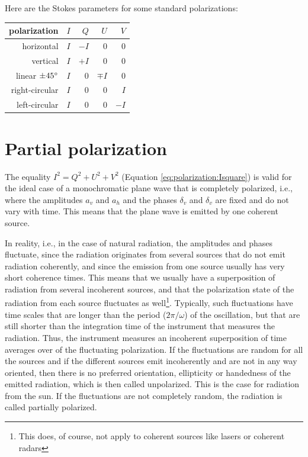 Here are the Stokes parameters for some standard polarizations:
\begin{center}
\label{stokes-examples}
\begin{tabular}{r@{\hspace{2em}(}r@{,}r@{,}r@{,}r@{)}}
\hline
polarization & $I$ &   $Q$   &   $U$  &   $V$ \\ \hline
horizontal   & $I$ &  $-I$   &    0   &   0   \\ 
vertical     & $I$ &  $+I$   &    0   &   0   \\ 
linear $\pm 45^\circ$
             & $I$ &   0     &$\mp I$ &   0   \\ 
right-circular& $I$ &  0     &    0   &   $I$ \\ 
left-circular& $I$ &   0     &    0   &  $-I$ \\ \hline
\end{tabular}
\end{center}



\section{Partial polarization}
\label{sec:polarization:part_pol}
The equality   $I^2 = Q^2 + U^2 + V^2$
(Equation \ref{eq:polarization:Isquare}) 
is valid for the ideal case of a 
monochromatic plane wave that is completely polarized, i.e., where the
amplitudes $a_v$ and
$a_h$ and the phases $\delta_v$ and $\delta_v$ are fixed and do not
vary with time. This means that the plane wave is emitted by one
coherent source.

In reality, i.e., in the case of natural radiation, 
the amplitudes and phases fluctuate, since the radiation
originates from several sources that do not emit radiation coherently,
and since the emission from one source usually has very short
coherence times. This
means that we usually have a superposition of radiation from several incoherent
sources, and that the polarization state of the radiation from each
source fluctuates as well\footnote{This does, of course, not apply to
  coherent sources like lasers or coherent radars}. 
Typically, such fluctuations have time scales that are longer than the
period ($2\pi/\omega$) of the oscillation, but that are still shorter
than the integration time of the instrument that measures the
radiation. Thus, the instrument measures an incoherent
 superposition of time averages
over of the fluctuating polarization. If the fluctuations are
random for all the sources and if the different sources emit 
incoherently and are not in any way oriented, then there is no preferred
orientation, ellipticity or handedness of the emitted radiation, which
is then called unpolarized. This is the case for radiation from the sun.
If the fluctuations are not completely random, the
radiation is called partially polarized.

